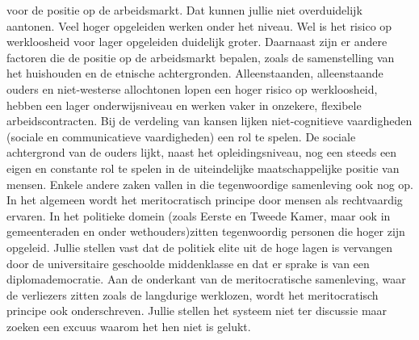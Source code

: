 \documentclass[]{book}
\begin{document}
voor de positie op de arbeidsmarkt. Dat kunnen jullie niet overduidelijk
aantonen. Veel hoger opgeleiden werken onder het niveau. Wel is het
risico op werkloosheid voor lager opgeleiden duidelijk groter. Daarnaast
zijn er andere factoren die de positie op de arbeidsmarkt bepalen, zoals
de samenstelling van het huishouden en de etnische achtergronden.
Alleenstaanden, alleenstaande ouders en niet-westerse allochtonen lopen
een hoger risico op werkloosheid, hebben een lager onderwijsniveau en
werken vaker in onzekere, flexibele arbeidscontracten. Bij de verdeling
van kansen lijken niet-cognitieve vaardigheden (sociale en
communicatieve vaardigheden) een rol te spelen. De sociale achtergrond
van de ouders lijkt, naast het opleidingsniveau, nog een steeds een
eigen en constante rol te spelen in de uiteindelijke maatschappelijke
positie van mensen. Enkele andere zaken vallen in die tegenwoordige
samenleving ook nog op. In het algemeen wordt het meritocratisch
principe door mensen als rechtvaardig ervaren. In het politieke domein
(zoals Eerste en Tweede Kamer, maar ook in gemeenteraden en onder
wethouders)zitten tegenwoordig personen die hoger zijn opgeleid. Jullie
stellen vast dat de politiek elite uit de hoge lagen is vervangen door
de universitaire geschoolde middenklasse en dat er sprake is van een
diplomademocratie. Aan de onderkant van de meritocratische samenleving,
waar de verliezers zitten zoals de langdurige werklozen, wordt het
meritocratisch principe ook onderschreven. Jullie stellen het systeem
niet ter discussie maar zoeken een excuus waarom het hen niet is gelukt.
\end{document}
